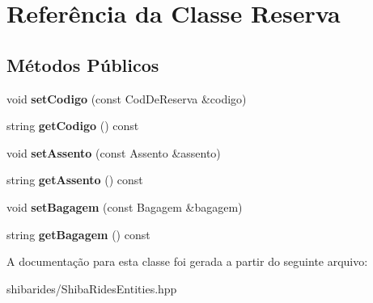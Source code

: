 \hypertarget{classReserva}{}\section{Referência da Classe Reserva}
\label{classReserva}
\subsection*{Métodos Públicos}
\begin{DoxyCompactItemize}
\item 
void {\bfseries set\+Codigo} (const Cod\+De\+Reserva \&codigo)\hypertarget{classReserva_aab5e39f6529be03b912390bb127f8ab4}{}\label{classReserva_aab5e39f6529be03b912390bb127f8ab4}

\item 
string {\bfseries get\+Codigo} () const \hypertarget{classReserva_a2ed852efc8778994385c701dd2046e5e}{}\label{classReserva_a2ed852efc8778994385c701dd2046e5e}

\item 
void {\bfseries set\+Assento} (const Assento \&assento)\hypertarget{classReserva_a3f2dfe2b6a619199e06ef57cf55f325a}{}\label{classReserva_a3f2dfe2b6a619199e06ef57cf55f325a}

\item 
string {\bfseries get\+Assento} () const \hypertarget{classReserva_a59988c309f290f276e74a95f542a5d62}{}\label{classReserva_a59988c309f290f276e74a95f542a5d62}

\item 
void {\bfseries set\+Bagagem} (const Bagagem \&bagagem)\hypertarget{classReserva_ab21c67d9f32a0f37d41e5895123f4f1f}{}\label{classReserva_ab21c67d9f32a0f37d41e5895123f4f1f}

\item 
string {\bfseries get\+Bagagem} () const \hypertarget{classReserva_a1289624574cb8b4e2623fe4c9ff8fdea}{}\label{classReserva_a1289624574cb8b4e2623fe4c9ff8fdea}

\end{DoxyCompactItemize}


A documentação para esta classe foi gerada a partir do seguinte arquivo\+:\begin{DoxyCompactItemize}
\item 
shibarides/Shiba\+Rides\+Entities.\+hpp\end{DoxyCompactItemize}
